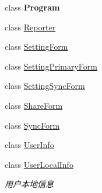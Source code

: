 \begin{DoxyCompactItemize}
class {\bfseries Program}
\item 
class \hyperlink{classcustom__cloud_1_1_reporter}{Reporter}
\item 
class \hyperlink{classcustom__cloud_1_1_setting_form}{Setting\+Form}
\item 
class \hyperlink{classcustom__cloud_1_1_setting_primary_form}{Setting\+Primary\+Form}
\item 
class \hyperlink{classcustom__cloud_1_1_setting_sync_form}{Setting\+Sync\+Form}
\item 
class \hyperlink{classcustom__cloud_1_1_share_form}{Share\+Form}
\item 
class \hyperlink{classcustom__cloud_1_1_sync_form}{Sync\+Form}
\item 
class \hyperlink{classcustom__cloud_1_1_user_info}{User\+Info}
\item 
class \hyperlink{classcustom__cloud_1_1_user_local_info}{User\+Local\+Info}
\begin{DoxyCompactList}\small\item\em 用户本地信息 \end{DoxyCompactList}\end{DoxyCompactItemize}
